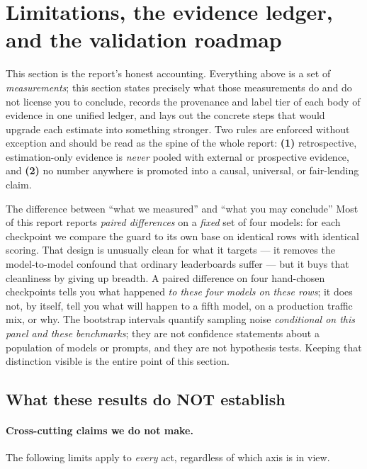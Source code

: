 \section{Limitations, the evidence ledger, and the validation roadmap}
\label{sec:honesty}

This section is the report's honest accounting. Everything above is a set of \emph{measurements}; this section states precisely what those measurements do and do not license you to conclude, records the provenance and label tier of each body of evidence in one unified ledger, and lays out the concrete steps that would upgrade each estimate into something stronger. Two rules are enforced without exception and should be read as the spine of the whole report: \textbf{(1)} retrospective, estimation-only evidence is \emph{never} pooled with external or prospective evidence, and \textbf{(2)} no number anywhere is promoted into a causal, universal, or fair-lending claim.

\begin{background}{The difference between ``what we measured'' and ``what you may conclude''}
Most of this report reports \emph{paired differences} on a \emph{fixed} set of four models: for each checkpoint we compare the guard to its own base on identical rows with identical scoring. That design is unusually clean for what it targets --- it removes the model-to-model confound that ordinary leaderboards suffer --- but it buys that cleanliness by giving up breadth. A paired difference on four hand-chosen checkpoints tells you what happened \emph{to these four models on these rows}; it does not, by itself, tell you what will happen to a fifth model, on a production traffic mix, or why. The bootstrap intervals quantify sampling noise \emph{conditional on this panel and these benchmarks}; they are not confidence statements about a population of models or prompts, and they are not hypothesis tests. Keeping that distinction visible is the entire point of this section.
\end{background}

\subsection{What these results do NOT establish}
\label{sec:not-establish}

\paragraph{Cross-cutting claims we do not make.} The following limits apply to \emph{every} act, regardless of which axis is in view.

